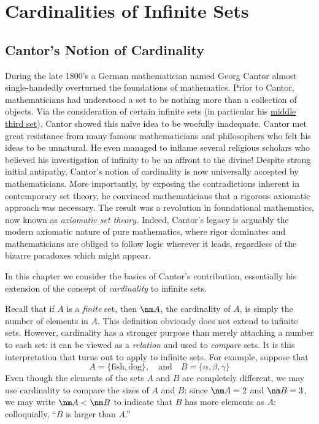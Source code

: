 \graphicspath{{8cardinality/asy/}}

\section{Cardinalities of Infinite Sets}\label{chap:cantor}


\subsection{Cantor's Notion of Cardinality}\label{subsec:cant}

During the late 1800's a German mathematician named Georg Cantor almost single-handedly overturned the foundations of mathematics. Prior to Cantor, mathematicians had understood a set to be nothing more than a collection of objects. Via the consideration of certain infinite sets (in particular his \hyperref[ex:cantor]{middle third set}), Cantor showed this naïve idea to be woefully inadequate. Cantor met great resistance from many famous mathematicians and philosophers who felt his ideas to be unnatural. He even managed to inflame several religious scholars who believed his investigation of infinity to be an affront to the divine! Despite strong initial antipathy, Cantor's notion of cardinality is now universally accepted by mathematicians. More importantly, by exposing the contradictions inherent in contemporary set theory, he convinced mathematicians that a rigorous axiomatic approach was necessary. The result was a revolution in foundational mathematics, now known as \emph{axiomatic set theory.} Indeed, Cantor's legacy is arguably the modern axiomatic nature of pure mathematics, where rigor dominates and mathematicians are obliged to follow logic wherever it leads, regardless of the bizarre paradoxes which might appear.\par

In this chapter we consider the basics of Cantor's contribution, essentially his extension of the concept of \emph{cardinality} to infinite sets.\par

Recall that if $A$ is a \emph{finite} set, then $\nm A$, the cardinality of $A$, is simply the number of elements in  $A$. This definition obviously does not extend to infinite sets. However, cardinality has a stronger purpose than merely attaching a number to each set: it can be viewed as a \emph{relation} and used to \emph{compare} sets. It is this interpretation that turns out to apply to infinite sets. For example, suppose that
\[
	A=\{\text{fish},\text{dog}\},\quad\text{and}\quad B=\{\alpha,\beta,\gamma\}
\]
Even though the elements of the sets $A$ and $B$ are completely different, we may use cardinality to compare the sizes of $A$ and $B$: since $\nm A=2$ and $\nm B=3$, we may write $\nm A<\nm B$ to indicate that $B$ has more elements as $A$: colloquially, ``$B$ is larger than $A$.''\par

